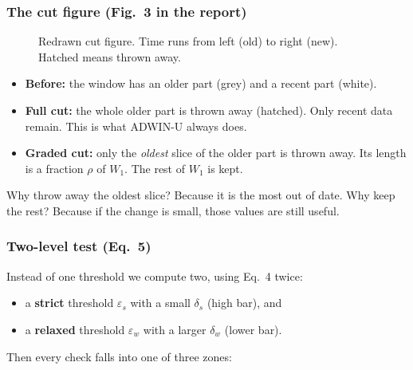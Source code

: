 \documentclass[11pt,a4paper]{article}
\begin{document}
\subsubsection*{The cut figure (Fig.~3 in the report)}

\begin{figure}[h]
\centering
{}
\caption{Redrawn cut figure. Time runs from left (old) to right (new). Hatched means thrown away.}
\end{figure}

\begin{itemize}
\item \textbf{Before:} the window has an older part (grey) and a recent part (white).
\item \textbf{Full cut:} the whole older part is thrown away (hatched). Only recent data remain. This is what ADWIN-U always does.
\item \textbf{Graded cut:} only the \emph{oldest} slice of the older part is thrown away. Its length is a fraction $\rho$ of $W_1$. The rest of $W_1$ is kept.
\end{itemize}
Why throw away the oldest slice? Because it is the most out of date. Why keep the rest? Because if the change is small, those values are still useful.

\subsubsection*{Two-level test (Eq.~5)}
Instead of one threshold we compute two, using Eq.~4 twice:
\begin{itemize}
\item a \textbf{strict} threshold $\varepsilon_s$ with a small $\delta_s$ (high bar), and
\item a \textbf{relaxed} threshold $\varepsilon_w$ with a larger $\delta_w$ (lower bar).
\end{itemize}
Then every check falls into one of three zones:
\end{document}
